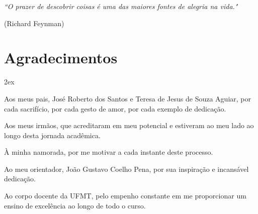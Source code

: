 \begin{titlepage}

\vspace*{\fill}

\hfill
\begin{minipage}{0.5\linewidth}
\begin{flushright}
\large\it
``O prazer de descobrir coisas 
é uma das maiores fontes de alegria na vida."

(Richard Feynman)
\end{flushright}
\end{minipage}

\vspace*{\fill}

\end{titlepage}

\chapter*{Agradecimentos}
\thispagestyle{empty}

\begin{trivlist}  \itemsep 2ex

\item Aos meus pais, José Roberto dos Santos e Teresa de Jesus de Souza Aguiar, por cada sacrifício, por cada gesto de amor, por cada exemplo de dedicação. 

\item Aos meus irmãos, que acreditaram em meu potencial e estiveram ao meu lado ao longo desta jornada acadêmica.

\item À minha namorada, por me motivar a cada instante deste processo.

\item Ao meu orientador, João Gustavo Coelho Pena, por sua inspiração e incansável dedicação.

\item Ao corpo docente da UFMT, pelo empenho constante em me proporcionar um ensino de excelência ao longo de todo o curso.

\end{trivlist}
